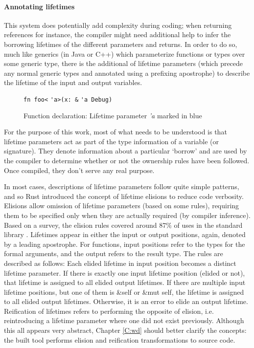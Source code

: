 \paragraph{Annotating lifetimes}
This system does potentially add complexity during coding; when returning references for instance, the compiler might need additional help to infer the borrowing lifetimes of the different parameters and returns. In order to do so, much like generics (in Java or C++) which parameterize functions or types over some generic type, there is the additional of lifetime parameters (which precede any normal generic types and annotated using a prefixing apostrophe) to describe the lifetime of the input and output variables.

\begin{figure}[H]
\centering
{\verb|fn foo<|}{\color{blue} \verb|'a|}{\verb|>(x: &|}
{\color{blue} \verb|'a|}{\verb| Debug)|}
\caption{Function declaration: Lifetime parameter \emph{'a} marked in blue}
\end{figure}

For the purpose of this work, most of what needs to be understood is that lifetime parameters act as part of the type information of a variable (or signature). They denote information about a particular `borrow' and are used by the compiler to determine whether or not the ownership rules have been followed. Once compiled, they don't serve any real purpose.

In most cases, descriptions of lifetime parameters follow quite simple patterns, and so Rust introduced the concept of lifetime elisions to reduce code verbosity. Elisions allow omission of lifetime parameters (based on some rules), requiring them to be specified only when they are actually required (by compiler inference). Based on a survey, the elision rules covered around 87\% of uses in the standard library \cite{elisionrules}. Lifetimes appear in either the input or output positions, again, denoted by a leading apostrophe. For functions, input positions refer to the types for the formal arguments, and the output refers to the result type. The rules are described as follows: Each elided lifetime in input position becomes a distinct lifetime parameter. If there is exactly one input lifetime position (elided or not), that lifetime is assigned to all elided output lifetimes. If there are multiple input lifetime positions, but one of them is \&self or \&mut self, the lifetime is assigned to all elided output lifetimes. Otherwise, it is an error to elide an output lifetime.  Reification of lifetimes refers to performing the opposite of elision, i.e. reintroducing a lifetime parameter where one did not exist previously. Although this all appears very abstract, Chapter \ref{C:wd} should better clarify the concepts: the built tool performs elision and reification transformations to source code.

